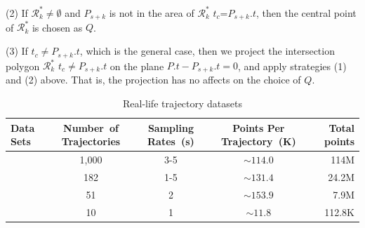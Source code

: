 \sstab (2) If $\mathcal{R}^*_k \ne \emptyset$ and $P_{s+k}$ is not in the area of $\mathcal{R}^*_k$ \wrt $t_c$=$P_{s+k}.t$, then the central point of $\mathcal{R}^*_k$ is chosen as $Q$.

\sstab (3)  If $t_c \ne P_{s+k}.t$, which is the general case, then we project the intersection polygon $\mathcal{R}^*_k$ \wrt $t_c \ne P_{s+k}.t$ on the plane $P.t -P_{s+k}.t = 0$, and apply strategies (1) and (2) above. That is, the projection has no affects on the choice of $Q$.





\begin{table}[bt!]
	\vspace{-1ex}
	\caption{\small Real-life trajectory datasets}
	\centering
	\small
	\begin{tabular}{|l|c|c|c|r|}
		\hline
		\bf{ Data Sets}& \bf{Number\ of Trajectories}     &\bf {Sampling Rates\ (s)}   &\bf{Points Per Trajectory\ (K)}    &\bf {Total points} \\
		\hline
		\sercar	&1,000	    &3-5	    &$\sim114.0$   &114M\\
		\hline
		\geolife &182	    &1-5	    &$\sim131.4$   &24.2M\\
		\hline
		\mopsi	&51	    	&2	    &$\sim153.9$     &7.9M\\
		\hline
		\pricar	& 10	    &1	        &$\sim11.8$      &112.8K \\
		\hline
	\end{tabular}
	\label{tab:datasets}
\end{table}


